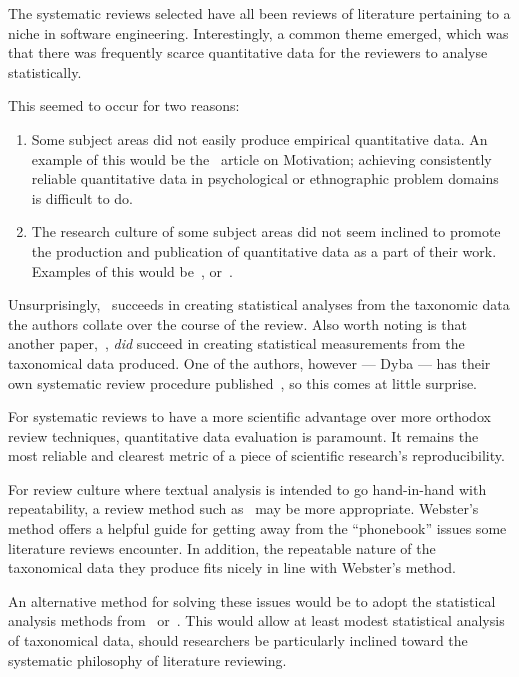 The systematic reviews selected have all been reviews of literature pertaining to a niche in software engineering. Interestingly, a common theme emerged, which was that there was frequently scarce quantitative data for the reviewers to analyse statistically.\par

This seemed to occur for two reasons:
\begin{enumerate}
    \item Some subject areas did not easily produce empirical quantitative data. An example of this would be the~\cite{Benavides} article on Motivation; achieving consistently reliable quantitative data in psychological or ethnographic problem domains is difficult to do.
    \item The research culture of some subject areas did not seem inclined to promote the production and publication of quantitative data as a part of their work. Examples of this would be~\cite{Chen2007}, or~\cite{Smite2010}. 
\end{enumerate}

Unsurprisingly,~\cite{Kitchenham2013} succeeds in creating statistical analyses from the taxonomic data the authors collate over the course of the review. Also worth noting is that another paper,~\cite{Kampenes2007}, \emph{did} succeed in creating statistical measurements from the taxonomical data produced. One of the authors, however --- Dyba --- has their own systematic review procedure published~\citep{dybaguidelines}, so this comes at little surprise.\par

For systematic reviews to have a more scientific advantage over more orthodox review techniques, quantitative data evaluation is paramount. It remains the most reliable and clearest metric of a piece of scientific research's reproducibility.\par

For review culture where textual analysis is intended to go hand-in-hand with repeatability, a review method such as~\cite{Webster2002} may be more appropriate. Webster's method offers a helpful guide for getting away from the ``phonebook'' issues some literature reviews encounter. In addition, the repeatable nature of the taxonomical data they produce fits nicely in line with Webster's method.\par

An alternative method for solving these issues would be to adopt the statistical analysis methods from~\cite{Kitchenham2013} or~\cite{Chen2007}. This would allow at least modest statistical analysis of taxonomical data, should researchers be particularly inclined toward the systematic philosophy of literature reviewing.\par

